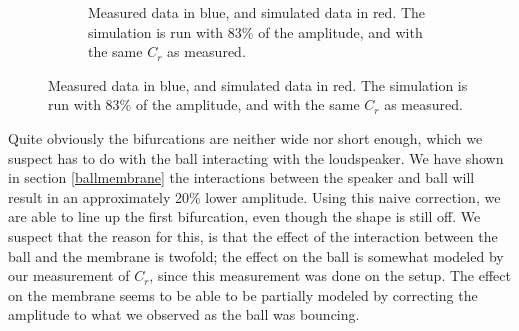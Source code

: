 \documentclass[12pt,oneside,a4paper]{article}
\numberwithin{equation}{section}
\begin{document}
{{{{\begin{figure}
\begin{subfigure}[t]{0.49\textwidth}
	\caption{Measured data in blue, and simulated data in red. The simulation is run with 83\% of the amplitude, and with the same $C_r$ as measured.}
	\label{fakedata}
\end{subfigure}
\end{figure}
Quite obviously the bifurcations are neither wide nor short enough, which we 
suspect has to do with the ball interacting with the loudspeaker. We have shown 
in section \ref{ballmembrane} the interactions between the speaker and ball 
will result in an approximately 20\% lower amplitude. Using this naive 
correction, we are able to line up the first bifurcation, even though the shape 
is still off. We suspect that the reason for this, is that the effect of the 
interaction between the ball and the membrane is twofold; the effect on the 
ball is somewhat modeled by our measurement of $C_r$, since this measurement 
was done on the setup. The effect on the membrane seems to be able to be 
partially modeled by correcting the amplitude to what we observed as the ball 
was bouncing.


}}}}
\end{document}
